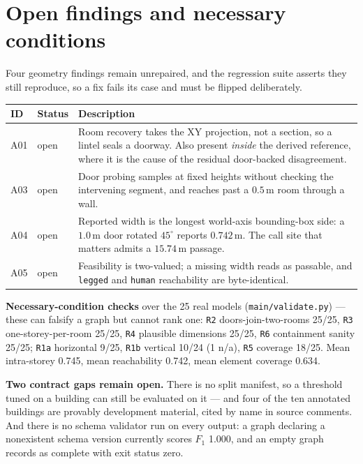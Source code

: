 \documentclass[11pt,a4paper]{article}
\newcommand{\code}[1]{\texttt{\small #1}}
\begin{document}
\section{Open findings and necessary conditions}

Four geometry findings remain unrepaired, and the regression suite asserts they
still reproduce, so a fix fails its case and must be flipped deliberately.

\begin{table}[ht]
\centering
\small
\begin{tabular}{llp{}}
\toprule
ID & Status & Description \\
\midrule
A01 & open & Room recovery takes the XY projection, not a section, so a lintel
seals a doorway. Also present \emph{inside} the derived reference, where it is
the cause of the residual door-backed disagreement. \\
A03 & open & Door probing samples at fixed heights without checking the
intervening segment, and reaches past a $0.5$\,m room through a wall. \\
A04 & open & Reported width is the longest world-axis bounding-box side: a
$1.0$\,m door rotated $45^{\circ}$ reports $0.742$\,m. The call site that
matters admits a $15.74$\,m passage. \\
A05 & open & Feasibility is two-valued; a missing width reads as passable, and
\code{legged} and \code{human} reachability are byte-identical. \\
\bottomrule
\end{tabular}
\end{table}

\noindent
\textbf{Necessary-condition checks} over the 25 real models
(\code{main/validate.py}) --- these can falsify a graph but cannot rank one:
\code{R2} doors-join-two-rooms 25/25, \code{R3} one-storey-per-room 25/25,
\code{R4} plausible dimensions 25/25, \code{R6} containment sanity 25/25;
\code{R1a} horizontal 9/25, \code{R1b} vertical 10/24 (1 n/a), \code{R5}
coverage 18/25. Mean intra-storey 0.745, mean reachability 0.742, mean element
coverage 0.634.

\noindent
\textbf{Two contract gaps remain open.} There is no split manifest, so a
threshold tuned on a building can still be evaluated on it --- and four of the
ten annotated buildings are provably development material, cited by name in
source comments. And there is no schema validator run on every output: a graph
declaring a nonexistent schema version currently scores $F_1$ 1.000, and an
empty graph records as complete with exit status zero.
\end{document}

